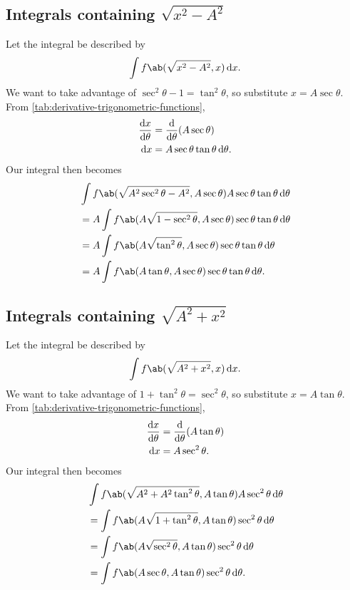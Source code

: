 \subsection*{Integrals containing \(\sqrt{x^2 - A^2}\)}

Let the integral be described by
\begin{equation}
  \int f\ab(\sqrt{x^2 - A^2}, x)\odif{x}.
\end{equation}
We want to take advantage of \(\sec^2\theta - 1 = \tan^2\theta\), so substitute \(x = A\sec\theta\). From \cref{tab:derivative-trigonometric-functions},
\begin{align}
  \odv{x}{\theta} & = \odv*{(A\sec\theta)}{\theta}        \\
  \odif{x}        & = A\sec\theta\tan\theta\odif{\theta}.
\end{align}
Our integral then becomes
\begin{align}
   & \int f\ab(\sqrt{A^2\sec^2\theta - A^2}, A\sec\theta)A\sec\theta\tan\theta\odif{\theta} \nonumber \\
   & = A\int f\ab(A\sqrt{1 - \sec^2\theta}, A\sec\theta)\sec\theta\tan\theta\odif{\theta}             \\
   & = A\int f\ab(A\sqrt{\tan^2\theta}, A\sec\theta)\sec\theta\tan\theta\odif{\theta}                 \\
   & = A\int f\ab(A\tan\theta, A\sec\theta)\sec\theta\tan\theta\odif{\theta}.
\end{align}

\subsection*{Integrals containing \(\sqrt{A^2 + x^2}\)}

Let the integral be described by
\begin{equation}
  \int f\ab(\sqrt{A^2 + x^2}, x)\odif{x}.
\end{equation}
We want to take advantage of \(1 + \tan^2\theta = \sec^2\theta\), so substitute \(x = A\tan\theta\). From \cref{tab:derivative-trigonometric-functions},
\begin{align}
  \odv{x}{\theta} & = \odv*{(A\tan\theta)}{\theta} \\
  \odif{x}        & = A\sec^2\theta.
\end{align}
Our integral then becomes
\begin{align}
   & \int f\ab(\sqrt{A^2 + A^2\tan^2\theta}, A\tan\theta)A\sec^2\theta\odif{\theta} \nonumber \\
   & = \int f\ab(A\sqrt{1 + \tan^2\theta}, A\tan\theta)\sec^2\theta\odif{\theta}              \\
   & = \int f\ab(A\sqrt{\sec^2\theta}, A\tan\theta)\sec^2\theta\odif{\theta}                  \\
   & = \int f\ab(A\sec\theta, A\tan\theta)\sec^2\theta\odif{\theta}.
\end{align}
